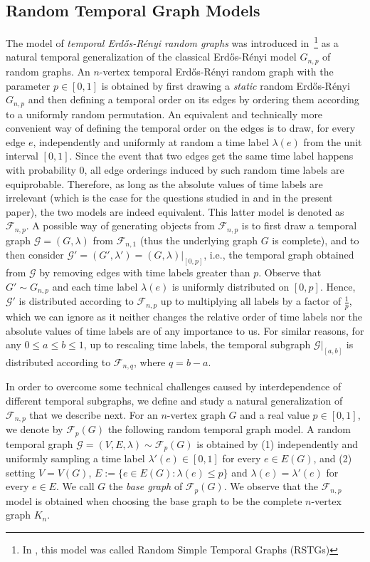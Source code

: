 \documentclass[a4paper,11pt]{article}
\theoremstyle{definition}
\theoremstyle{plain}
\newcommand{\FFF}{\mathcal{F}}
\newcommand{\GGG}{\mathcal{G}}
\newcommand{\G}{\mathcal G}
\newcommand{\F}{\mathcal F}
\newcommand{\Erdos}{Erd\H{o}s}
\newcommand{\Renyi}{R\'enyi}
\newcommand{\ER}{\Erdos-\Renyi}
\begin{document}
\subsection{Random Temporal Graph Models}
The model of \emph{temporal \ER{} random graphs} was introduced in~\cite{CasteigtsRRZ21}\footnote{In \cite{CasteigtsRRZ21}, this model was called Random Simple Temporal Graphs (RSTGs)} as a natural temporal generalization of the classical \ER{} model $G_{n,p}$ of random graphs. An $n$-vertex temporal \ER{} random graph with the parameter $p \in [0,1]$ is obtained by first drawing a \emph{static} random \ER{} $G_{n,p}$ and then defining a temporal order on its
edges by ordering them according to a uniformly random permutation. An equivalent and technically more convenient way of defining the temporal order on the edges is to draw, for every edge $e$, independently and uniformly at random a time label
$\lambda(e)$ from the unit interval $[0,1]$. Since the event that two edges get the same time label happens with probability 0,
all edge orderings induced by such random time labels are equiprobable. Therefore, as long as the absolute values of time labels are irrelevant (which is the case for the questions studied in \cite{CasteigtsRRZ21} and in the present paper), the two models are indeed equivalent. This latter model is denoted as $\F_{n,p}$. A possible way of generating objects from $\F_{n,p}$ is to first draw a temporal graph $\G=(G, \lambda)$ from $\F_{n,1}$ (thus the underlying graph $G$ is complete), and to then
consider $\G' = (G',\lambda') = (G,\lambda)|_{[0,p]}$, i.e., the temporal graph obtained from $\G$ by removing edges
with time labels greater than $p$. Observe that $G' \sim G_{n,p}$ and each time label $\lambda(e)$ is uniformly distributed
on $[0,p]$. Hence, $\G'$ is distributed according to $\F_{n,p}$ up to multiplying all labels by a factor of $\frac{1}{p}$, which we can ignore as it neither changes the relative order of time labels nor the absolute values of time labels are of any importance to us.
For similar reasons, for any $0 \leq a \leq b \leq 1$, up to rescaling time labels, the temporal subgraph $\G|_{[a,b]}$ is distributed according to $\F_{n,q}$, where $q=b-a$.

In order to overcome some technical challenges caused by interdependence of different temporal subgraphs, we define and study a natural generalization of $\F_{n,p}$ that we describe next.
%
For an $n$-vertex graph $G$ and a real value $p\in [0,1]$, we denote by $\FFF_p(G)$ the following random temporal graph model. A random temporal graph $\GGG=(V, E, \lambda) \sim \FFF_p(G)$ is obtained by
(1) independently and uniformly sampling a time label $\lambda'(e)\in [0,1]$ for every $e\in E(G)$, and
(2) setting $V=V(G)$, $E:=\{e\in E(G):\lambda(e)\le p\}$ and $\lambda(e) = \lambda'(e)$ for every $e\in E$.
We call $G$ the \emph{base graph} of $\FFF_p(G)$.
We observe that the $\FFF_{n,p}$ model is obtained when choosing the base graph to be the complete $n$-vertex graph $K_n$.
\end{document}
